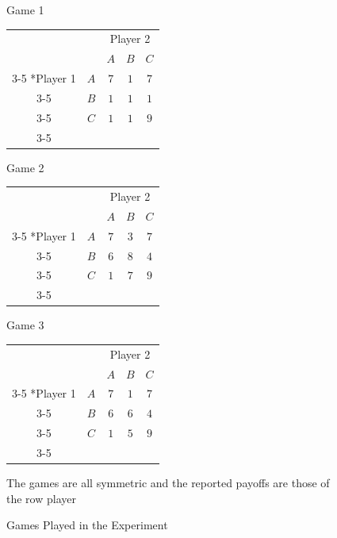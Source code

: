 \vskip12pt
\begin{figure}[h]
\captionsetup{justification=centering}
  \caption{Games Played in the Experiment}
   \label{fig:Games}

    \begin{minipage}[c]{.32\textwidth}
    \centering
    Game 1
    \vskip6pt
    \begin{tabular}{cc|c|c|c|}
          & \multicolumn{1}{c}{} & \multicolumn{3}{c}{Player 2}\\
          & \multicolumn{1}{c}{} & \multicolumn{1}{c}{$A$} 
          & \multicolumn{1}{c}{$B$} 
          & \multicolumn{1}{c}{$C$} \\\cline{3-5}
      \multirow{2}*{Player 1}  & $A$ & $7$ & $1$ & $7$ \\\cline{3-5}
      & $B$ & $1$ & $1$ & $1$ \\\cline{3-5}
      & $C$ & $1$ & $1$ & $9$ \\\cline{3-5}
    \end{tabular}
\end{minipage}
\begin{minipage}[c]{.32\textwidth}
\centering
Game 2
\vskip6pt
\begin{tabular}{cc|c|c|c|}
      & \multicolumn{1}{c}{} & \multicolumn{3}{c}{Player 2}\\
      & \multicolumn{1}{c}{} & \multicolumn{1}{c}{$A$}  & \multicolumn{1}{c}{$B$} & \multicolumn{1}{c}{$C$} \\\cline{3-5}
      \multirow{2}*{Player 1}  & $A$ & $7$ & $3$ & $7$ \\\cline{3-5}
      & $B$ & $6$ & $8$ & $4$ \\\cline{3-5}
      & $C$ & $1$ & $7$ & $9$ \\\cline{3-5}
    \end{tabular}
\end{minipage}
\begin{minipage}[c]{.32\textwidth}
\centering
Game 3
\vskip6pt
\begin{tabular}{cc|c|c|c|}
      & \multicolumn{1}{c}{} & \multicolumn{3}{c}{Player 2}\\
      & \multicolumn{1}{c}{} & \multicolumn{1}{c}{$A$}  & \multicolumn{1}{c}{$B$} & \multicolumn{1}{c}{$C$} \\\cline{3-5}
      \multirow{2}*{Player 1}  & $A$ & $7$ & $1$ & $7$ \\\cline{3-5}
      & $B$ & $6$ & $6$ & $4$ \\\cline{3-5}
      & $C$ & $1$ & $5$ & $9$ \\\cline{3-5}
    \end{tabular}
\end{minipage}
\vskip12pt
\small
\centering

The games are all symmetric and the reported payoffs are those of the row player
\end{figure}
\justifying
\vskip12pt

